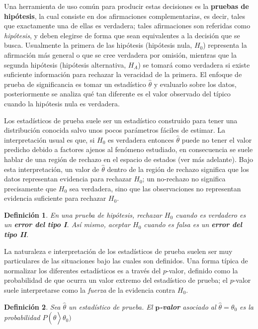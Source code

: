 \documentclass[12pt,letterpaper,draft]{book}
\newtheorem{definicion}{Definición}[chapter]
\newcommand{\est}[1]{\widehat{ #1 }}
\begin{document}
Una herramienta de uso común para producir estas decisiones es la \textbf{pruebas de hipótesis},
la cual consiste en dos afirmaciones complementarias, es decir, tales que exactamente una de ellas es verdadera; tales afirmaciones
son referidas como \textit{hipótesis}, y deben elegirse de forma que sean equivalentes a la 
decisión que se busca. 
%
Usualmente la primera de las hipótesis (hipótesis nula, $H_0$) representa la afirmación más general o que se cree verdadera por omisión, mientras que la segunda hipótesis (hipótesis alternativa, $H_A$) se tomará como verdadera si
existe suficiente información para rechazar la veracidad de la primera.
%
El enfoque de prueba de significancia es  tomar un estadístico $\est{\theta}$ y evaluarlo sobre los datos, posteriormente se analiza qué tan diferente es el valor observado del típico cuando la hipótesis nula es verdadera.

Los estadísticos de prueba suele ser un estadístico construido para tener una distribución conocida salvo unos pocos parámetros fáciles de estimar.
%
La interpretación usual es que, si $H_0$ es verdadera entonces $\est{\theta}$ puede no tener el valor predicho debido a factores ajenos al fenómeno estudiado, en consecuencia se suele hablar de una región de rechazo en el espacio de estados (ver más adelante).
%
Bajo esta interpretación, un valor de $\widehat{\theta}$ dentro de la región de rechazo significa que los datos representan evidencia para rechazar $H_0$; un no-rechazo no significa precisamente que $H_0$ sea verdadera, sino que las observaciones no representan evidencia suficiente para rechazar $H_0$.

\begin{definicion}
En una prueba de hipótesis, rechazar $H_0$ cuando es verdadero es un \textbf{error del tipo I}. Así mismo, aceptar $H_0$ cuando es falsa es un \textbf{error del tipo II}.
\end{definicion}

La naturaleza e interpretación de los estadísticos de prueba suelen ser muy particulares de las situaciones bajo las cuales son definidos.
%
Una forma típica de normalizar los diferentes estadísticos es a través del $p$-valor, definido como la probabilidad de que ocurra un valor extremo del estadístico de prueba; 
el $p$-valor suele interpretarse como la \textit{fuerza} de la evidencia contra $H_0$.

\begin{definicion}
Sea $\widehat{\theta}$ un estadístico de prueba. El \textbf{$\boldsymbol{p}$-valor} asociado al $\widehat{\theta}=\theta_0$ es la probabilidad $P\left(\widehat{\theta}\right>\theta_0)$
\end{definicion}
\end{document}
